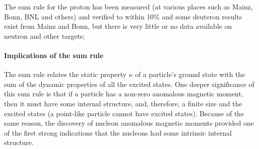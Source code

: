 \begin{comment}
The sum rule was derived in the late 1960s based on some very general assumptions as follows:
\begin{enumerate}
\item \textbf{Lorentz and gauge invarianc}e in the form of the \textbf{low energy theorem of Low, Goldman and Goldberger} %
\item \textbf{Unitarity} in the form of the \textbf{optical theorem}
\item \textbf{Causality} in the form of an \textbf{unsubtracted dispersion relation for forward Compton scattering}. %
\end{enumerate}
\end{comment}

The sum rule for the proton has been measured (at various places such as Mainz, Bonn, BNL %
and others) and verified to within 10\% \cite{PhysRevLett.91.192001, PhysRevLett.94.162001, Drechsel:2004ki, PhysRevLett.102.172002} and some deuteron results exist from Mainz and Bonn, but there is very little or no data available on neutron and other targets;%

\paragraph{Implications of the sum rule} 
The sum rule relates the static property $\kappa$ of a particle's ground state with the sum of the dynamic properties of all the excited states. One deeper significance of this sum rule is that if a particle has a non-zero anomalous magnetic moment, then it must have some internal structure, and, therefore, a finite size and the excited states (a point-like particle cannot have excited states).
Because of the same reason, the discovery of nucleon anomalous magnetic moments provided one of the first strong indications that the nucleons had some intrinsic internal structure.

